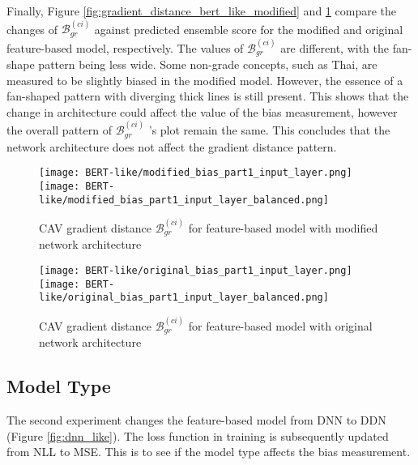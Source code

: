 Finally, Figure \ref{fig:gradient_distance_bert_like_modified} and \ref{fig:gradient_distance_bert_like_original} compare the changes of $\mathcal{B}^{(ci)}_{gr}$ against predicted ensemble score for the modified and original feature-based model, respectively. The values of $\mathcal{B}^{(ci)}_{gr}$ are different, with the fan-shape pattern being less wide. Some non-grade concepts, such as Thai, are measured to be slightly biased in the modified model. However, the essence of a fan-shaped pattern with diverging thick lines is still present. This shows that the change in architecture could affect the value of the bias measurement, however the overall pattern of $\mathcal{B}^{(ci)}_{gr}$ 's plot remain the same. This concludes that the network architecture does not affect the gradient distance pattern.

\begin{figure}[H]
    \centering
    \begin{minipage}[t]{0.48\textwidth}
        \centering
        \texttt{[image: BERT-like/modified\_bias\_part1\_input\_layer.png]}
        \hfill
        \texttt{[image: BERT-like/modified\_bias\_part1\_input\_layer\_balanced.png]}
        \caption{CAV gradient distance $\mathcal{B}^{(ci)}_{gr}$ for feature-based model with modified network architecture}
        \label{fig:gradient_distance_bert_like_modified}
    \end{minipage}
    \hfill
    \begin{minipage}[t]{0.48\textwidth}
        \centering
        \texttt{[image: BERT-like/original\_bias\_part1\_input\_layer.png]}
        \hfill
        \texttt{[image: BERT-like/original\_bias\_part1\_input\_layer\_balanced.png]}
        \caption{CAV gradient distance $\mathcal{B}^{(ci)}_{gr}$ for feature-based model with original network architecture}
        \label{fig:gradient_distance_bert_like_original}
    \end{minipage}
\end{figure}


\subsection{Model Type}
The second experiment changes the feature-based model from DNN to DDN (Figure \ref{fig:dnn_like}). The loss function in training is subsequently updated from NLL to MSE. This is to see if the model type affects the bias measurement.

